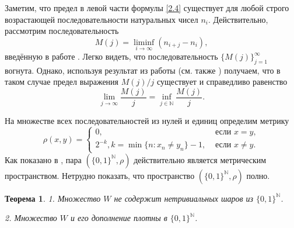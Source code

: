 \documentclass[12pt]{article}
\newtheorem{thm}{Теорема}
\def\N{{\mathbb{N}}}
\begin{document}
Заметим, что предел в левой части формулы \eqref{2.4} существует для любой строго возрастающей последовательности натуральных чисел $n_i$. Действительно,  рассмотрим последовательность
\begin{equation*}
\label{eq:definition_M_j}
M(j) = \liminf_{i\to\infty} (n_{i+j} - n_i),
\end{equation*}
введённую в работе \cite{Avdeev2019}. Легко видеть, что последовательность $\{M(j)\}_{j=1}^\infty$ вогнута. Однако, используя результат из работы \cite{Fekete} (см. также \cite[I, Задача 98]{polia1978zadachi}) получаем, что в таком случае предел выражения $M(j)/j$ существует и справедливо равенство
$$\lim_{j\to\infty}\frac{M(j)}{j} =\inf_{j\in\N}\frac{M(j)}{j}.$$



На множестве всех последовательностей из нулей и единиц определим метрику
$$
	\rho(x,y)=
	\begin{cases}
		0, & \mbox{~если~} x=y, \\
		2^{-k}, k = \min\{n:x_n \neq y_n\} - 1, & \mbox{~если~} x\neq y. %
	\end{cases}
$$
Как показано в \cite[Утверждение 2.1.8]{Edgar}, пара $(\{0,1\}^\N, \rho)$ действительно является метрическим пространством.
Нетрудно показать, что пространство $(\{0,1\}^\N, \rho)$ полно.


\begin{thm}
1. Множество $W$ не содержит нетривиальных шаров из $\{0,1\}^\N$.

2. Множество $W$ и его дополнение плотны в $\{0,1\}^\N$.
\end{thm}
\end{document}
